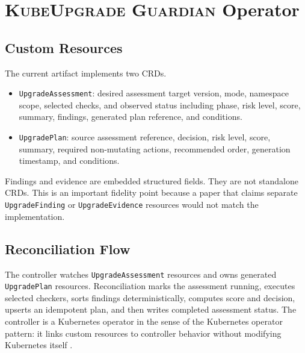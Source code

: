\documentclass[10pt,journal]{IEEEtran}
\newcommand{\tool}{\textsc{KubeUpgrade Guardian}}
\newcommand{\crd}[1]{\texttt{#1}}
\begin{document}
\section{\tool{} Operator}
\subsection{Custom Resources}
The current artifact implements two CRDs.
\begin{itemize}[leftmargin=*]
  \item \crd{UpgradeAssessment}: desired assessment target version, mode, namespace scope, selected checks, and observed status including phase, risk level, score, summary, findings, generated plan reference, and conditions.
  \item \crd{UpgradePlan}: source assessment reference, decision, risk level, score, summary, required non-mutating actions, recommended order, generation timestamp, and conditions.
\end{itemize}

Findings and evidence are embedded structured fields. They are not standalone CRDs. This is an important fidelity point because a paper that claims separate \crd{UpgradeFinding} or \crd{UpgradeEvidence} resources would not match the implementation.

\subsection{Reconciliation Flow}
The controller watches \crd{UpgradeAssessment} resources and owns generated \crd{UpgradePlan} resources. Reconciliation marks the assessment running, executes selected checkers, sorts findings deterministically, computes score and decision, upserts an idempotent plan, and then writes completed assessment status. The controller is a Kubernetes operator in the sense of the Kubernetes operator pattern: it links custom resources to controller behavior without modifying Kubernetes itself \cite{kubernetesOperatorPattern,kubernetesCustomResources,cncfOperatorWhitepaper}.
\end{document}
